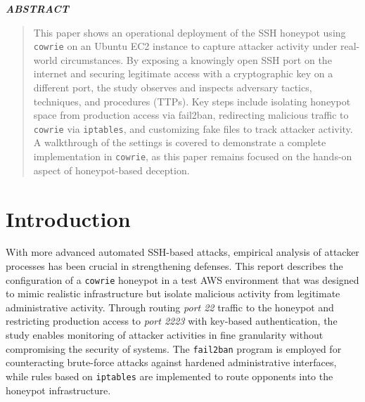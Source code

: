\documentclass{cls/ULBreport}
\renewenvironment{abstract}{%
  \clearpage
  \thispagestyle{plain}
  \begin{center}
    \bfseries\itshape ABSTRACT
  \end{center}
  \vspace{0.5cm}
  \begin{quote}
    \itshape
    \justifying
}{%
  \end{quote}
  \clearpage
}
\begin{document}
    
    \renewcommand{\rmdefault}{cmr} %
    \renewcommand{\sfdefault}{cmss} %
    \renewcommand{\ttdefault}{cmtt} %
    
    \makeatletter
    \renewcommand{\reset@font}{\normalfont\@setfontsize\f@size{12}{14.4}}
    \makeatother
    \normalfont


    \begin{abstract}        
    This paper shows an operational deployment of the SSH honeypot using \texttt{cowrie} on an Ubuntu EC2 instance to capture attacker activity under real-world circumstances. By exposing a knowingly open SSH port on the internet and securing legitimate access with a cryptographic key on a different port, the study observes and inspects adversary tactics, techniques, and procedures (TTPs). Key steps include isolating honeypot space from production access via fail2ban, redirecting malicious traffic to \texttt{cowrie} via \texttt{iptables}, and customizing fake files to track attacker activity. A walkthrough of the settings is covered to demonstrate a complete implementation in \texttt{cowrie}, as this paper remains focused on the hands-on aspect of honeypot-based deception. 
    \end{abstract}
    \newpage


    \section{Introduction}
    With more advanced automated SSH-based attacks, empirical analysis of attacker processes has been crucial in strengthening defenses. This report describes the configuration of a \texttt{cowrie} honeypot in a test AWS environment that was designed to mimic realistic infrastructure but isolate malicious activity from legitimate administrative activity. Through routing \textit{port 22} traffic to the honeypot and restricting production access to \textit{port 2223} with key-based authentication, the study enables monitoring of attacker activities in fine granularity without compromising the security of systems. The \texttt{fail2ban} program is employed for counteracting brute-force attacks against hardened administrative interfaces, while rules based on \texttt{iptables} are implemented to route opponents into the honeypot infrastructure. 
\end{document}
